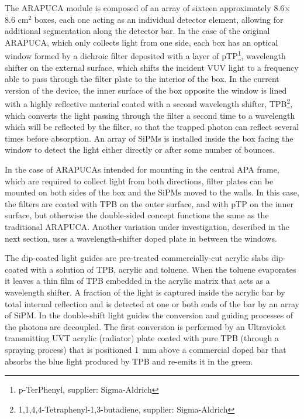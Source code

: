 The ARAPUCA module is composed of an array of sixteen approximately 8.6$\times$8.6 cm$^2$ boxes, 
 each one acting as an individual detector element, allowing for additional segmentation along the detector bar. 
In the case of the original ARAPUCA, which only collects light from one side, each box has an optical window formed  
by a dichroic filter deposited with a layer of pTP\footnote{p-TerPhenyl,  supplier: Sigma-Aldrich\textregistered},
wavelength shifter on the external surface, which shifts the incident VUV light to a frequency able to pass through the filter plate to the interior
of the box.  
In the current version of the device, the inner surface of the box opposite the window is lined 
with a highly reflective material coated with a second wavelength shifter, TPB\footnote{1,1,4,4-Tetraphenyl-1,3-butadiene,
supplier: Sigma-Aldrich\textregistered},
which converts the light passing through the filter a second time to a wavelength which will be reflected by the filter, so that the trapped photon can reflect several times before absorption. An array of SiPMs is installed inside the box facing the window to detect the light either directly or after some number of bounces.

In the case of ARAPUCAs intended for mounting in the central APA frame, which are required to collect light from both directions, filter plates can be mounted on both sides of the box and the SiPMs moved to the walls.  In this case, the filters are coated with TPB on the outer surface, and with pTP on the inner surface, but otherwise the double-sided concept functions the same as the traditional ARAPUCA. 
Another variation under investigation, described in the next section, uses a wavelength-shifter doped plate in between the windows.




The dip-coated light guides are pre-treated commercially-cut acrylic slabs dip-coated with a solution of TPB, acrylic and toluene. 
When the toluene evaporates it leaves a thin film of TPB embedded in the acrylic matrix that acts as a wavelength 
shifter. A fraction of the light is captured inside the acrylic bar by total 
internal reflection and is detected at one or both ends of the bar by an array of SiPM.
In the double-shift light guides the conversion and guiding processes of the photons are decoupled. The first conversion is
performed by an Ultraviolet transmitting UVT acrylic (radiator) plate coated with pure TPB (through a spraying process) that is positioned \SI{1}{mm} above a commercial doped bar that absorbs the blue
light produced by TPB and re-emits it in the green.


